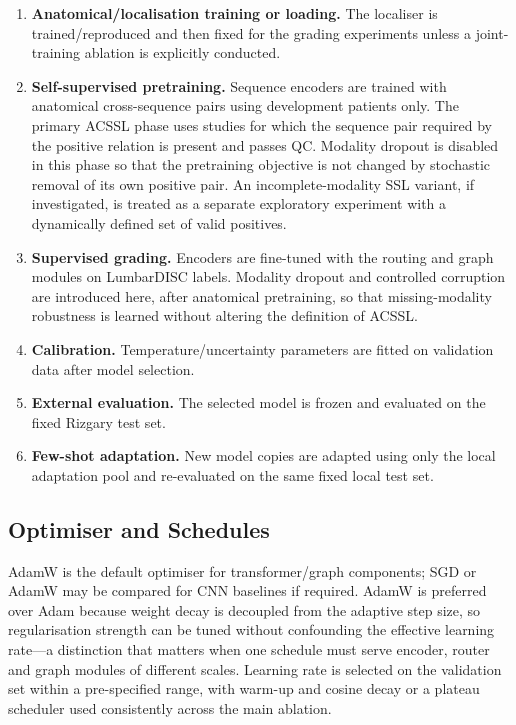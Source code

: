 \begin{enumerate}
  \item \textbf{Anatomical/localisation training or loading.}
        The localiser is trained/reproduced and then fixed for the grading
        experiments unless a joint-training ablation is explicitly conducted.

  \item \textbf{Self-supervised pretraining.}
        Sequence encoders are trained with anatomical cross-sequence pairs using
        development patients only. The primary ACSSL phase uses studies for which
        the sequence pair required by the positive relation is present and passes
        QC. Modality dropout is disabled in this phase so that the pretraining
        objective is not changed by stochastic removal of its own positive pair.
        An incomplete-modality SSL variant, if investigated, is treated as a
        separate exploratory experiment with a dynamically defined set of valid
        positives.

  \item \textbf{Supervised grading.}
        Encoders are fine-tuned with the routing and graph modules on
        LumbarDISC labels. Modality dropout and controlled corruption are
        introduced here, after anatomical pretraining, so that missing-modality
        robustness is learned without altering the definition of ACSSL.

  \item \textbf{Calibration.}
        Temperature/uncertainty parameters are fitted on validation data after
        model selection.

  \item \textbf{External evaluation.}
        The selected model is frozen and evaluated on the fixed Rizgary test
        set.

  \item \textbf{Few-shot adaptation.}
        New model copies are adapted using only the local adaptation pool and
        re-evaluated on the same fixed local test set.
\end{enumerate}

\subsection{Optimiser and Schedules}
\label{sec:method-optimiser}

AdamW \cite{loshchilov2019decoupled} is the default optimiser for
transformer/graph components; SGD or AdamW may be compared for CNN baselines if
required. AdamW is preferred over Adam \cite{kingma2015adam} because weight
decay is decoupled from the adaptive step size, so regularisation strength can
be tuned without confounding the effective learning rate---a distinction that
matters when one schedule must serve encoder, router and graph modules of
different scales. Learning rate is selected on the validation set within a
pre-specified range, with warm-up and cosine decay \cite{loshchilov2017sgdr} or
a plateau scheduler used consistently across the main ablation.

